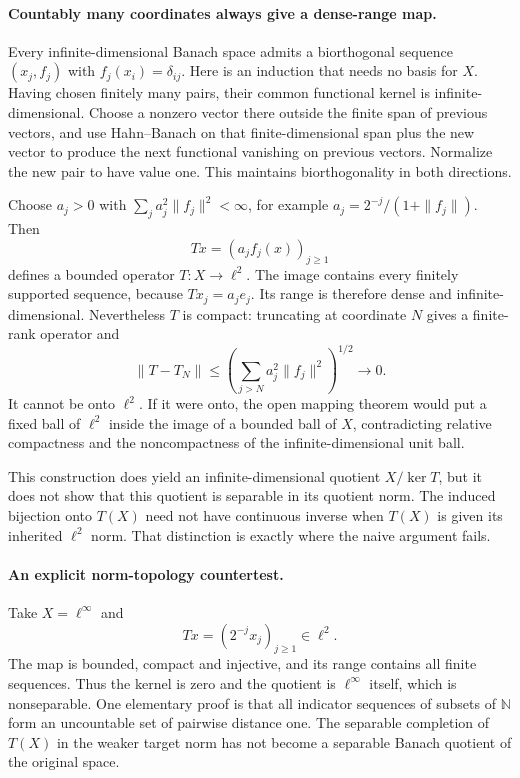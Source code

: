 \documentclass[11pt]{article}
\begin{document}
\paragraph{Countably many coordinates always give a dense-range map.}
Every infinite-dimensional Banach space admits a biorthogonal sequence
$(x_j,f_j)$ with $f_j(x_i)=\delta_{ij}$. Here is an induction that needs
no basis for $X$. Having chosen finitely many pairs, their common
functional kernel is infinite-dimensional. Choose a nonzero vector
there outside the finite span of previous vectors, and use
Hahn--Banach on that finite-dimensional span plus the new vector to
produce the next functional vanishing on previous vectors. Normalize
the new pair to have value one. This maintains biorthogonality in both
directions.

Choose $a_j>0$ with $\sum_j a_j^2\|f_j\|^2<\infty$, for example
$a_j=2^{-j}/(1+\|f_j\|)$. Then
\[
 Tx=(a_jf_j(x))_{j\geq1}
\]
defines a bounded operator $T:X\to\ell^2$. The image contains every
finitely supported sequence, because $Tx_j=a_je_j$. Its range is
therefore dense and infinite-dimensional. Nevertheless $T$ is compact:
truncating at coordinate $N$ gives a finite-rank operator and
\[
 \|T-T_N\|\leq
 \left(\sum_{j>N}a_j^2\|f_j\|^2\right)^{1/2}\longrightarrow0.
\]
It cannot be onto $\ell^2$. If it were onto, the open mapping theorem
would put a fixed ball of $\ell^2$ inside the image of a bounded ball
of $X$, contradicting relative compactness and the noncompactness of
the infinite-dimensional unit ball.

This construction does yield an infinite-dimensional quotient
$X/\ker T$, but it does not show that this quotient is separable in
its quotient norm. The induced bijection onto $T(X)$ need not have
continuous inverse when $T(X)$ is given its inherited $\ell^2$ norm.
That distinction is exactly where the naive argument fails.

\paragraph{An explicit norm-topology countertest.}
Take $X=\ell^\infty$ and
\[
 Tx=(2^{-j}x_j)_{j\geq1}\in\ell^2.
\]
The map is bounded, compact and injective, and its range contains all
finite sequences. Thus the kernel is zero and the quotient is
$\ell^\infty$ itself, which is nonseparable. One elementary proof is
that all indicator sequences of subsets of $\mathbb N$ form an
uncountable set of pairwise distance one. The separable completion
of $T(X)$ in the weaker target norm has not become a separable
Banach quotient of the original space.
\end{document}
